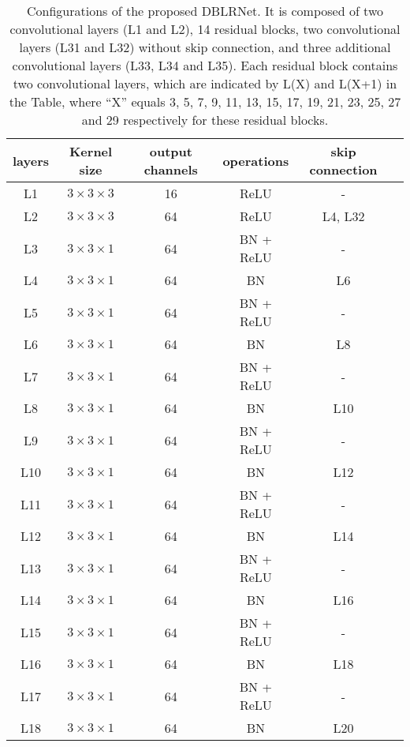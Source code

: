 \documentclass[journal]{IEEEtran}
\begin{document}
\begin{table}
  \centering
  \scriptsize
  \caption{Configurations of the proposed DBLRNet. It is composed of two convolutional layers (L1 and L2), 14 residual blocks, two convolutional layers (L31 and L32)  without skip connection, and three additional convolutional layers (L33, L34 and L35). Each residual block contains two convolutional layers, which are indicated by L(X) and L(X+1) in the Table, where ``X'' equals 3, 5, 7, 9, 11, 13, 15, 17, 19, 21, 23, 25, 27 and 29 respectively for these residual blocks.}
    \begin{tabular}{cccccc}
    \toprule
    layers & Kernel size & output channels & operations & skip connection\\
    \midrule
     L1     & $3 \times 3 \times 3$  & 16 & ReLU & - \\
     L2       & $3 \times 3 \times 3$  & 64 & ReLU & L4, L32 \\    
     \midrule
     L3     & $3 \times 3 \times 1$  & 64 & BN + ReLU & - \\
     L4     & $3 \times 3 \times 1$  & 64 & BN        & L6 \\     
     L5     & $3 \times 3 \times 1$  & 64 & BN + ReLU & - \\
     L6     & $3 \times 3 \times 1$  & 64 & BN        & L8 \\        
     L7     & $3 \times 3 \times 1$  & 64 & BN + ReLU & - \\
     L8     & $3 \times 3 \times 1$  & 64 & BN        & L10 \\ 
     L9     & $3 \times 3 \times 1$  & 64 & BN + ReLU & - \\
     L10    & $3 \times 3 \times 1$  & 64 & BN        & L12 \\ 
     L11    & $3 \times 3 \times 1$  & 64 & BN + ReLU & - \\
     L12    & $3 \times 3 \times 1$  & 64 & BN        & L14 \\
     L13    & $3 \times 3 \times 1$  & 64 & BN + ReLU & - \\
     L14    & $3 \times 3 \times 1$  & 64 & BN        & L16 \\
     L15    & $3 \times 3 \times 1$  & 64 & BN + ReLU & - \\
     L16    & $3 \times 3 \times 1$  & 64 & BN        & L18 \\ 
     L17    & $3 \times 3 \times 1$  & 64 & BN + ReLU & - \\
     L18    & $3 \times 3 \times 1$  & 64 & BN        & L20 \\ 

\end{tabular}
\end{table}
\end{document}
